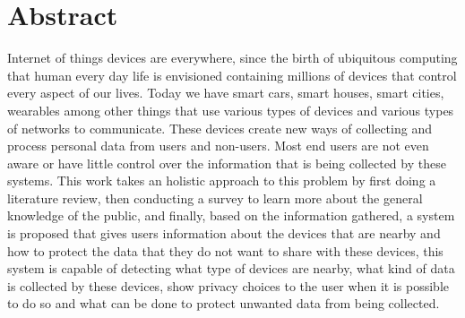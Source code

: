 %
%

\chapter*{Abstract}
\justify

Internet of things devices are everywhere, since the birth of ubiquitous
computing that human every day life is envisioned containing millions of
devices that control every aspect of our lives. Today we have smart cars,
smart houses, smart cities, wearables among other things that use various
types of devices and various types of networks to communicate. These devices
create new ways of collecting and process personal data from users and
non-users. Most end users are not even aware or have little control over
the information that is being collected by these systems. This work takes
an holistic approach to this problem by first doing a literature review,
then conducting a survey to learn more about the general knowledge of the
public, and finally, based on the information gathered, a system is proposed
that gives users information about the devices that are nearby and how
to protect the data that they do not want to share with these devices, this
system is capable of detecting what type of devices are nearby, what kind
of data is collected by these devices, show privacy choices to the user
when it is possible to do so and what can be done to protect unwanted data
from being collected.

